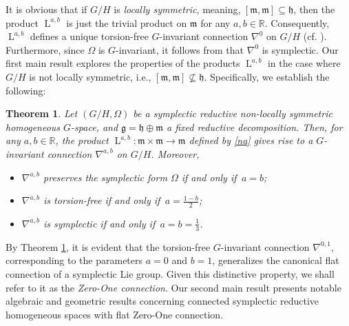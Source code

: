 \documentclass[preprint,12pt,1p]{elsarticle}
\theoremstyle{plain}
\newtheorem{theorem}{Theorem}[section]
\theoremstyle{definition}
\newcommand{\rel}{\mathbb{R}}
\newcommand{\n}{\nabla}
\newcommand{\g}{\mathfrak{g}}
\newcommand{\h}{\mathfrak{h}}
\newcommand{\m}{\mathfrak{m}}
\numberwithin{equation}{section}
\newcommand{\lab}{\operatorname{L}^{a,b}}
\newcommand{\nab}{\n^{a,b}}
\begin{document}
It is obvious that if $G/H$ is \textit{locally symmetric}, meaning, $[\m,\m]\subseteq\h$, then the product $\lab$ is just the trivial product on $\m$ for any $a,b\in\rel$. Consequently, $\lab$ defines a unique torsion-free $G$-invariant connection $\n^0$ on $G/H$ (cf. \cite{Nom1}). Furthermore, since $\Omega$ is $G$-invariant, it follows from \cite[pp. 193-194]{Kob2} that $\n^0$ is symplectic. Our first main result explores the properties of the products $\lab$ in the case where $G/H$ is not locally symmetric, i.e., $[\m,\m]\nsubseteq\h$. Specifically, we establish the following:

\begin{theorem}\label{thm1}
Let $(G/H,\Omega)$ be a symplectic reductive non-locally symmetric homogeneous $G$-space, and $\g=\h\oplus\m$ a fixed reductive decomposition. Then, for any $a,b\in\rel$, the product $\lab:\mathfrak{m}\times\mathfrak{m}\to\mathfrak{m}$ defined by \eqref{na} gives rise to a $G$-invariant connection $\nab$ on $G/H$. Moreover, \begin{itemize}
\item[$(1)$] $\nab$ preserves the symplectic form $\Omega$ if and only if $\,a=b$; 
\item[$(2)$] $\nab$  is torsion-free  if and only if $\,a=\tfrac{1-b}{2}$;  
\item[$(3)$] $\nab$ is symplectic if and only if $\,a=b=\frac{1}{3}$.
\end{itemize}
\end{theorem}

By Theorem \ref{thm1}, it is evident that the torsion-free $G$-invariant connection $\n^{0,1}$, corresponding to the parameters $a=0$ and $b=1$, generalizes the canonical flat connection of a symplectic Lie group. Given this distinctive property, we shall refer to it as the \textit{Zero-One connection}. Our second main result presents notable algebraic and geometric results concerning connected symplectic reductive homogeneous spaces with flat Zero-One connection.
\end{document}
